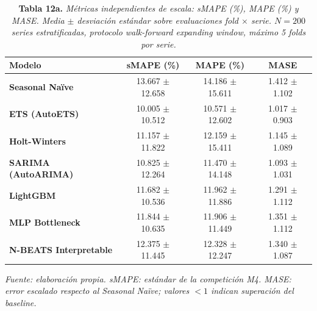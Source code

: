 \begin{table}[H]
\caption{\textbf{Tabla 12a.} \textit{Métricas independientes de escala: sMAPE (\%), MAPE (\%) y MASE. Media $\pm$ desviación estándar sobre evaluaciones fold $\times$ serie. $N=200$ series estratificadas, protocolo walk-forward expanding window, máximo 5 folds por serie.}}
\label{tab:resultados}
\vspace{4pt}
\small
\begin{tabular}{>{\raggedright\arraybackslash}p{4.0cm}ccc}
\toprule
\textbf{Modelo} & \textbf{sMAPE (\%)} & \textbf{MAPE (\%)} & \textbf{MASE} \\
\midrule
\textbf{Seasonal Naïve} & 13.667 $\pm$ 12.658 & 14.186 $\pm$ 15.611 & 1.412 $\pm$ 1.102 \\
\textbf{ETS (AutoETS)} & 10.005 $\pm$ 10.512 & 10.571 $\pm$ 12.602 & 1.017 $\pm$ 0.903 \\
\textbf{Holt-Winters} & 11.157 $\pm$ 11.822 & 12.159 $\pm$ 15.411 & 1.145 $\pm$ 1.089 \\
\textbf{SARIMA (AutoARIMA)} & 10.825 $\pm$ 12.264 & 11.470 $\pm$ 14.148 & 1.093 $\pm$ 1.031 \\
\textbf{LightGBM} & 11.682 $\pm$ 10.536 & 11.962 $\pm$ 11.886 & 1.291 $\pm$ 1.112 \\
\textbf{MLP Bottleneck} & 11.844 $\pm$ 10.635 & 11.906 $\pm$ 11.449 & 1.351 $\pm$ 1.112 \\
\textbf{N-BEATS Interpretable} & 12.375 $\pm$ 11.445 & 12.328 $\pm$ 12.247 & 1.340 $\pm$ 1.087 \\
\bottomrule
\end{tabular}
\normalsize
\vspace{4pt}

\small\textit{Fuente: elaboración propia. sMAPE: estándar de la competición M4. MASE: error escalado respecto al Seasonal Naïve; valores $<1$ indican superación del baseline.}
\end{table}

